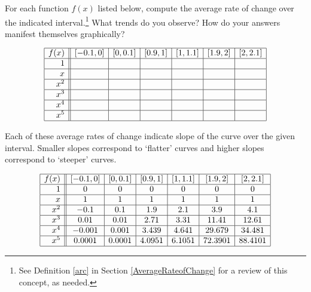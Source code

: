\documentclass{ximera}
\begin{document}
\begin{problem}
For each function $f(x)$ listed below, compute the average rate of change over the indicated interval.\footnote{See Definition \ref{arc} in Section \ref{AverageRateofChange} for a review of this concept, as needed.}  What trends do you observe?  How do your answers manifest themselves graphically?

\[ \begin{array}{|r||c|c|c|c|c|c|}  \hline

 f(x) &  [-0.1, 0] & [0, 0.1] &[0.9, 1] & [1, 1.1] & [1.9, 2] & [2, 2.1]  \\ \hline
 1 &&&&&& \\  \hline
 x  &&&&&& \\  \hline
 x^2 &&&&&&  \\  \hline
 x^3 &&&&&& \\  \hline
 x^4 &&&&&& \\ \hline
 x^5 &&&&&& \\ \hline

\end{array} \]

\begin{solution}
Each of these average rates of change indicate slope of the curve over the given interval.  Smaller slopes correspond to `flatter' curves and higher slopes correspond to `steeper' curves.

\[ \begin{array}{|r||c|c|c|c|c|c|}  \hline

 f(x) &  [-0.1, 0] & [0, 0.1] &[0.9, 1] & [1, 1.1] & [1.9, 2] & [2, 2.1]  \\ \hline
 1 &  0 &   0  & 0   & 0   & 0  & 0 \\  \hline
 x &  1 &   1  & 1   & 1   & 1  & 1 \\  \hline
 x^2 & -0.1 & 0.1 & 1.9 & 2.1 & 3.9 & 4.1  \\  \hline
 x^3 & 0.01  & 0.01 & 2.71 & 3.31 & 11.41 & 12.61 \\  \hline
 x^4&  -0.001 & 0.001 & 3.439 & 4.641 & 29.679 & 34.481 \\ \hline
 x^5 & 0.0001 & 0.0001 & 4.0951 & 6.1051 & 72.3901 & 88.4101 \\ \hline

\end{array} \]
\end{solution}

\end{problem}
\end{document}
